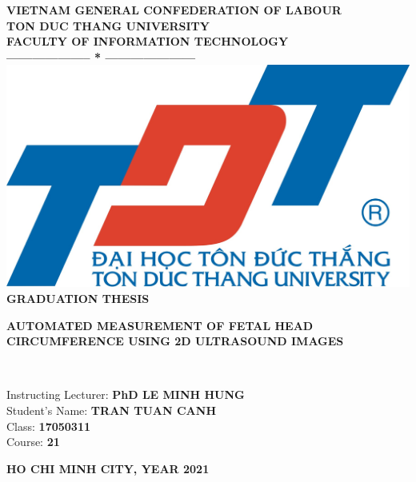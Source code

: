 \thispagestyle{empty}
\vspace{1cm}
\begin{center}
{\fontsize{14pt}{1}\selectfont \textbf{VIETNAM GENERAL CONFEDERATION OF LABOUR}}\\
{\fontsize{14pt}{1}\selectfont \textbf{TON DUC THANG UNIVERSITY}}\\
{\fontsize{14pt}{1}\selectfont \textbf{FACULTY OF INFORMATION TECHNOLOGY}}\\
\textbf{--------------------  *  ---------------------}\\[2cm]
\includegraphics[scale=0.3]{./hinhanh/tdt.jpg}\\[1.7cm]
{\fontsize{16pt}{1}\selectfont \textbf{GRADUATION THESIS}}\\[1.7cm]
{\parbox[t]{10cm}{\fontsize{16pt}{1}\selectfont 
		\begin{center}
			\large\textbf{AUTOMATED MEASUREMENT OF FETAL HEAD CIRCUMFERENCE USING 2D ULTRASOUND IMAGES}
\end{center}}}\\[1.3cm]

\end{center}


\begin{flushright}
	
{\fontsize{14pt}{1}\selectfont Instructing Lecturer:  \textbf{PhD LE MINH HUNG}}\\
{ \fontsize{14pt}{1}
 Student's Name:
\textbf{TRAN TUAN CANH}\\
\hspace{0.5cm} Class: \textbf{17050311}\\

Course: \textbf{21}
%
}
\end{flushright}


\vspace{1cm}
\begin{center}
{\fontsize{13pt}{1}\selectfont \textbf{HO CHI MINH CITY, YEAR 2021}}
\end{center}

\clearpage
\setcounter{page}{1}
